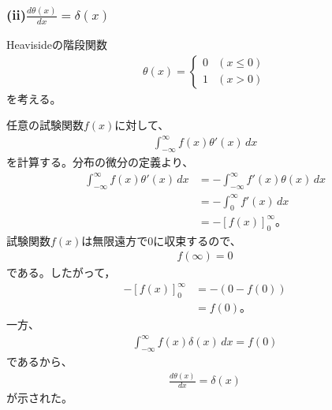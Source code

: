 \documentclass[platex、dvipdfmx、a4paper]{jsarticle}
\newcommand{\bbn}[2]{\frac{d #1}{d #2}}
\begin{document}
  \subsubsection*{(ii)$\bbn{\theta(x)}{x}=\delta(x)$}

  Heavisideの階段関数
  \begin{align*}
    \theta(x)
    =
    \begin{cases}
      0 &(x\le0) \\
      1 &(x>0)
    \end{cases}
  \end{align*}
  を考える。

  任意の試験関数$f(x)$に対して、
  \begin{align*}
    \int_{-\infty}^{\infty} f(x)\theta'(x)\,dx
  \end{align*}
  を計算する。分布の微分の定義より、
  \begin{align*}
    \int_{-\infty}^{\infty} f(x)\theta'(x)\,dx
    &= -\int_{-\infty}^{\infty} f'(x)\theta(x)\,dx \\
    &= -\int_0^{\infty} f'(x)\,dx \\
    &= -[f(x)]_0^{\infty}。
  \end{align*}
  試験関数$f(x)$は無限遠方で0に収束するので、
  \begin{align*}
    f(\infty)=0
  \end{align*}
  である。したがって，
  \begin{align*}
    -[f(x)]_0^{\infty}
    &= -(0-f(0)) \\
    &= f(0)。
  \end{align*}
  一方、
  \begin{align*}
    \int_{-\infty}^{\infty} f(x)\delta(x)\,dx=f(0)
  \end{align*}
  であるから、
  \begin{align*}
    \bbn{\theta(x)}{x}=\delta(x)
  \end{align*}
  が示された。
\end{document}
